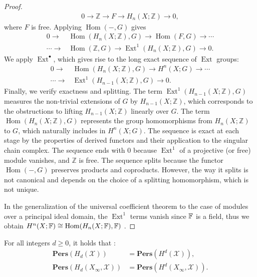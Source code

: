 \begin{proof}
\begin{align}
0 \rightarrow \mathbb{Z} \rightarrow F \rightarrow H_{n}(X; \mathbb{Z}) \rightarrow 0,
\end{align}
where $F$ is free. Applying $\operatorname{Hom}(-, G)$ gives
\begin{align}
0 \rightarrow &\operatorname{Hom}(H_{n}(X; \mathbb{Z}), G) \rightarrow \operatorname{Hom}(F, G) \rightarrow \cdots \\
\cdots \rightarrow &\operatorname{Hom}(\mathbb{Z}, G) \rightarrow \operatorname{Ext}^{1}(H_{n}(X; \mathbb{Z}), G) \rightarrow 0.
\end{align}
We apply $\operatorname{Ext}^{\bullet}$, which gives rise to the long exact sequence of $\operatorname{Ext}$ groups:
\begin{align}
0 \rightarrow &\operatorname{Hom}(H_{n}(X; \mathbb{Z}), G) \rightarrow H^{n}(X; G) \rightarrow \cdots \\
\cdots \rightarrow &\operatorname{Ext}^{1}(H_{n-1}(X; \mathbb{Z}), G) \rightarrow 0.
\end{align}
Finally, we verify exactness and splitting. The term $\operatorname{Ext}^{1}(H_{n-1}(X; \mathbb{Z}), G)$ measures the non-trivial extensions of $G$ by $H_{n-1}(X; \mathbb{Z})$, which corresponds to the obstructions to lifting $H_{n-1}(X; \mathbb{Z})$ linearly over $G$. The term $\operatorname{Hom}(H_{n}(X; \mathbb{Z}), G)$ represents the group homomorphisms from $H_{n}(X; \mathbb{Z})$ to $G$, which naturally includes in $H^{n}(X; G)$. The sequence is exact at each stage by the properties of derived functors and their application to the singular chain complex. The sequence ends with $0$ because $\operatorname{Ext}^{1}$ of a projective (or free) module vanishes, and $\mathbb{Z}$ is free. The sequence splits because the functor $\operatorname{Hom}(-, G)$ preserves products and coproducts. However, the way it splits is not canonical and depends on the choice of a splitting homomorphism, which is not unique.

In the generalization of the universal coefficient theorem to the case of modules over a principal ideal domain, the $\operatorname{Ext}^{1}$ terms vanish since ${\mathbb{F}}$ is a field, thus we obtain $H^{n}(X;{\mathbb{F}}) \cong \operatorname{Hom}(H_{n}(X;{\mathbb{F}}),{\mathbb{F}})$ \cite[p.198 \S 3.3.1]{hatcher2005algebraic}.
\end{proof}

\begin{theorem}
For all integers $d \geq 0$, it holds that \cite[\S 2.3]{de2011dualities}:
\begin{align}
\textbf{Pers}(H_{d}(\mathcal{X})) &= \textbf{Pers}(H^{d}(\mathcal{X})), \\
\textbf{Pers}(H_{d}(X_{\infty}, \mathcal{X})) &= \textbf{Pers}(H^{d}(X_{\infty}, \mathcal{X})).
\end{align}
\end{theorem}


